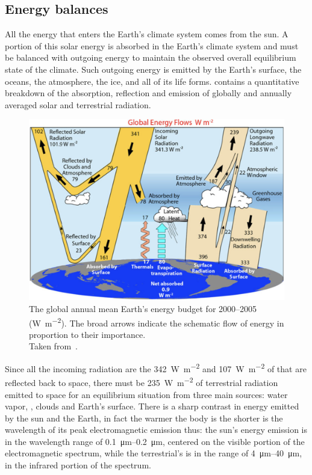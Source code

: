 \subsection{Energy balances}
All the energy that enters the Earth’s climate system comes from the sun.
A portion of this solar energy is absorbed in the Earth's climate system and must be balanced with
outgoing energy to maintain the observed overall equilibrium state of the climate.
Such outgoing energy is emitted by the Earth's surface, the oceans, the atmosphere, the ice, and all of its life forms.
\fig{\ref{fig:global-mean-energy-budget}} contains a quantitative breakdown of the absorption, reflection and emission of
globally and annually averaged solar and terrestrial radiation.
\begin{figure}
	\centering
	\includegraphics[width = .7 \textwidth]{figs/global-mean-energy-budget-trenberth}
	\caption{The global annual mean Earth’s energy budget for 2000–2005 (\unit{\watt.\meter^{-2}}). The broad arrows indicate
		the schematic flow of energy in proportion to their importance. \\ Taken from~\citet{Trenberth2012}.}
	\label{fig:global-mean-energy-budget}
\end{figure}
Since all the incoming radiation are the \qty{342}{\watt.\meter^{-2}} and \qty{107}{\watt m^{-2}} of that are reflected back to space, there must be
\qty{235}{\watt.\meter^{-2}} of terrestrial radiation emitted to space for an equilibrium situation from three main sources:
water vapor, , clouds and Earth’s surface.
There is a sharp contrast in energy emitted by the sun and the Earth, in fact the warmer the body is the shorter is the wavelength of its peak electromagnetic emission
thus: the sun’s energy emission is in the wavelength range of \qtyrange{0.1}{0.2}{\micro \m}, centered on the visible portion of
the electromagnetic spectrum, while the terrestrial’s is in the range of \qtyrange{4}{40}{\micro \m}, in the infrared portion
of the spectrum.


